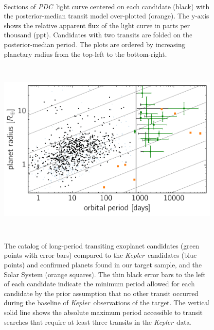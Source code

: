 \documentclass[manuscript, letterpaper]{aastex6}
\newcommand{\project}[1]{\textsl{#1}}
\newcommand{\kepler}{\project{Kepler}}
\newcommand{\pdc}{\project{PDC}}
\newcommand{\dfmfiglabel}[1]{\label{fig:#1}}
\begin{document}
\begin{figure}[p]~\\
\begin{center}

\end{center}
\caption{%
Sections of \pdc\ light curve centered on each candidate (black) with the
posterior-median transit model over-plotted (orange).
The y-axis shows the relative apparent flux of the light curve in parts per
thousand (ppt).
Candidates with two transits are folded on the posterior-median period.
The plots are ordered by increasing planetary radius from the top-left to the
bottom-right.
\dfmfiglabel{light-curves}}
\end{figure}

\begin{figure}~\\
\begin{center}
\includegraphics{figures/full_sample_plus_cands.pdf}
\end{center}
\caption{%
The catalog of long-period transiting exoplanet candidates (green points with
error bars) compared to the \kepler\ candidates (blue points) and confirmed
planets \citep[black points;][]{Morton:2016} found in our target sample, and
the Solar System (orange squares).
The thin black error bars to the left of each candidate indicate the minimum
period allowed for each candidate by the prior assumption that no other
transit occurred during the baseline of \kepler\ observations of the target.
The vertical solid line shows the absolute maximum period accessible to
transit searches that require at least three transits in the \kepler\ data.
\dfmfiglabel{full-sample}}~\\
\end{figure}
\end{document}
